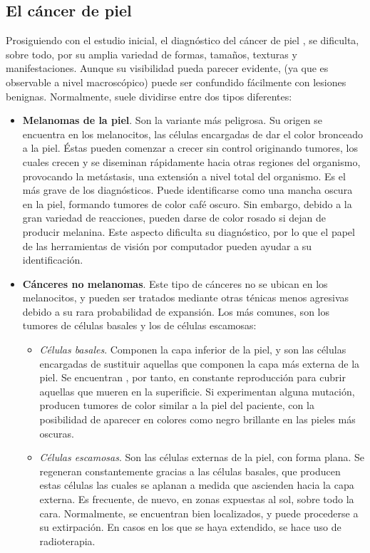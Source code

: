 \newpage
\subsection{El cáncer de piel}

Prosiguiendo con el estudio inicial, el diagnóstico del cáncer de piel  \cite{cancerpieltipos}, se dificulta, sobre todo, por su amplia variedad de formas, tamaños, texturas y manifestaciones. Aunque su visibilidad pueda parecer evidente, (ya que es observable a nivel macroscópico) puede ser confundido fácilmente con lesiones benignas. Normalmente, suele dividirse entre dos tipos diferentes:
\begin{itemize}
	\item \textbf{Melanomas de la piel}. Son la variante más peligrosa. Su origen se encuentra en los melanocitos, las células encargadas de dar el color bronceado a la piel.  Éstas pueden comenzar a crecer sin control originando tumores, los cuales crecen y se diseminan rápidamente hacia otras regiones del organismo, provocando la metástasis, una extensión a nivel total del organismo. Es el más grave de los diagnósticos. Puede identificarse como una mancha oscura en la piel, formando tumores de color café oscuro. Sin embargo, debido a la gran variedad de reacciones, pueden darse de color rosado si dejan de producir melanina. Este aspecto dificulta su diagnóstico, por lo que el papel de las herramientas de visión por computador pueden ayudar a su identificación.
	\item \textbf{Cánceres no melanomas}. Este tipo de cánceres no se ubican en los melanocitos, y pueden ser tratados mediante otras ténicas menos agresivas debido a su rara probabilidad de expansión. Los más comunes, son los tumores de células basales y los de células escamosas:
	\begin{itemize}
		\item \textit{Células basales}. Componen la capa inferior de la piel, y son las células encargadas de sustituir aquellas que componen la capa más externa de la piel. Se encuentran , por tanto, en constante reproducción para cubrir aquellas que mueren en la superificie. Si experimentan alguna mutación, producen tumores de color similar a la piel del paciente, con la posibilidad de aparecer en colores como negro brillante en las pieles más oscuras.
		
		\item \textit{Células escamosas}. Son las células externas de la piel, con forma plana. Se regeneran constantemente gracias a las células basales, que producen estas células las cuales se aplanan a medida que ascienden hacia la capa externa. Es frecuente, de nuevo, en zonas expuestas al sol, sobre todo la cara. Normalmente, se encuentran bien localizados, y puede procederse a su extirpación. En casos en los que se haya extendido, se hace uso de radioterapia.
		
	\end{itemize}
\end{itemize}


